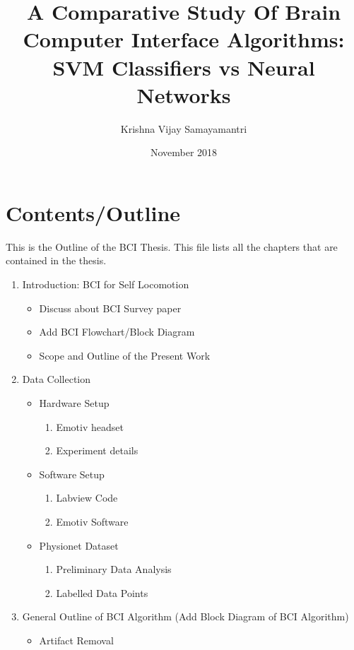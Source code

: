 \documentclass{article}
\title{A Comparative Study Of Brain Computer Interface Algorithms: SVM Classifiers vs Neural Networks}
\author{Krishna Vijay Samayamantri}
\date{November 2018}
\begin{document}
\maketitle

\section{Contents/Outline}
This is the Outline of the BCI Thesis. This file lists all the chapters that are contained in the thesis.
\begin{enumerate}
    \item Introduction: BCI for Self Locomotion
    \begin{itemize}
        \item Discuss about BCI Survey paper
        \item Add BCI Flowchart/Block Diagram
        \item Scope and Outline of the Present Work
    \end{itemize}
    \item Data Collection
    \begin{itemize}
        \item Hardware Setup 
        \begin{enumerate}
            \item Emotiv headset 
            \item Experiment details
        \end{enumerate}
        \item Software Setup 
        \begin{enumerate}
            \item Labview Code
            \item Emotiv Software
        \end{enumerate}
        \item Physionet Dataset
        \begin{enumerate}
            \item Preliminary Data Analysis
            \item Labelled Data Points
        \end{enumerate}
    \end{itemize}
    \item General Outline of BCI Algorithm
    \newline (Add Block Diagram of BCI Algorithm)
    \begin{itemize}
        \item Artifact Removal
        \begin{enumerate}

\end{enumerate}
\end{itemize}
\end{enumerate}
\end{document}

